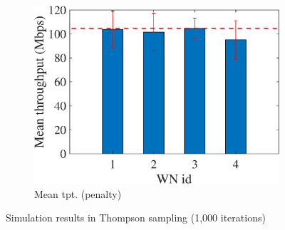 \documentclass[preprint,12pt]{article}
\begin{document}
\begin{figure}[h!]
\begin{subfigure}[b]{.3\textwidth}
		\includegraphics[width=\textwidth]{images/mean_tpt_PEG}
		\caption{Mean tpt. (penalty)}\label{fig:mean_tpt_PEG}
	\end{subfigure}
	\caption{Simulation results in Thompson sampling (1,000 iterations)}
	\label{fig:ts}
\end{figure}
\end{document}
